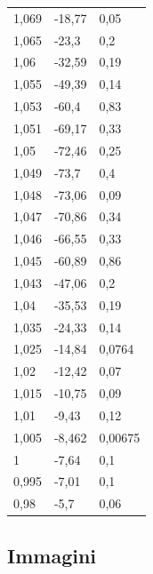 \documentclass[12pt]{article}
\begin{document}
\begin{table}[ht]
\begin{minipage}{0.40\textwidth}
\begin{tabularx}{\linewidth}{|X|X|X|}
      1,069 & -18,77 & 0,05 \\
      1,065 & -23,3 & 0,2 \\
      1,06 & -32,59 & 0,19 \\
      1,055 & -49,39 & 0,14 \\
      1,053 & -60,4 & 0,83 \\
      1,051 & -69,17 & 0,33 \\
      1,05 & -72,46 & 0,25 \\
      1,049 & -73,7 & 0,4 \\
      1,048 & -73,06 & 0,09 \\
      1,047 & -70,86 & 0,34 \\
      1,046 & -66,55 & 0,33 \\
      1,045 & -60,89 & 0,86 \\
      1,043 & -47,06 & 0,2 \\
      1,04 & -35,53 & 0,19 \\
      1,035 & -24,33 & 0,14 \\
      1,025 & -14,84 & 0,0764 \\
      1,02 & -12,42 & 0,07 \\
      1,015 & -10,75 & 0,09 \\
      1,01 & -9,43 & 0,12 \\
      1,005 & -8,462 & 0,00675 \\
      1 & -7,64 & 0,1 \\
      0,995 & -7,01 & 0,1 \\
      0,98 & -5,7 & 0,06 \\
      \hline
    \end{tabularx}
  \end{minipage}
\end{table}
  
\newpage

\subsection{Immagini}
\end{document}
